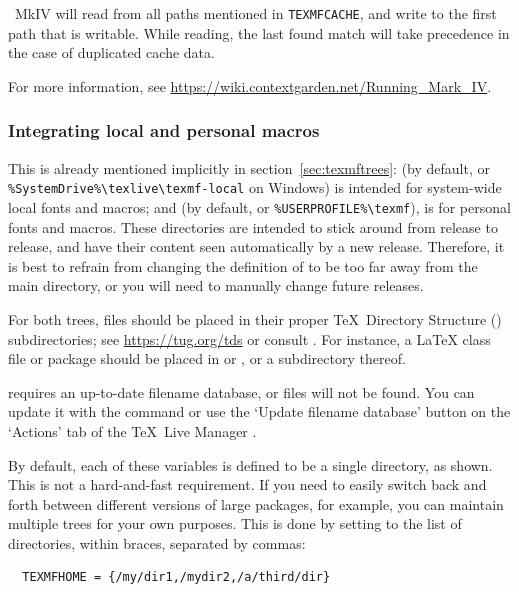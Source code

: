 \documentclass{article}
\begin{document}
\ConTeXt\ MkIV will read from
all paths mentioned in \verb+TEXMFCACHE+, and write to the first
path that is writable. While reading, the last found match will 
take precedence in the case of duplicated cache data.

For more information, see
\url{https://wiki.contextgarden.net/Running_Mark_IV}.


\subsubsection{Integrating local and personal macros}
\label{sec:local-personal-macros}

This is already mentioned implicitly in section~\ref{sec:texmftrees}:
 (by default,
 or
\verb|%SystemDrive%\texlive\texmf-local| on Windows)
is intended for system-wide local fonts and macros; and
 (by default,  or
\verb|%USERPROFILE%\texmf|), is for personal fonts and macros.  These
directories are intended to stick around from release to release, and
have their content seen automatically by a new \TL{} release.
Therefore, it is best to refrain from changing the definition of
 to be too far away from the main \TL{} directory,
or you will need to manually change future releases.

For both trees, files should be placed in their proper \TeX\ Directory
Structure (\TDS) subdirectories; see \url{https://tug.org/tds} or consult
. For instance, a \LaTeX{} class file or
package should be placed in  or
, or a subdirectory thereof.

 requires an up-to-date filename database, or files
will not be found.  You can update it with the command
 or use the `Update filename database' button on the
`Actions' tab of the \TeX\ Live Manager \GUI.

By default, each of these variables is defined to be a single directory,
as shown.  This is not a hard-and-fast requirement.  If you need to
easily switch back and forth between different versions of large
packages, for example, you can maintain multiple trees for your own
purposes.  This is done by setting  to the
list of directories, within braces, separated by commas:

\begin{verbatim}
  TEXMFHOME = {/my/dir1,/mydir2,/a/third/dir}
\end{verbatim}
\end{document}
